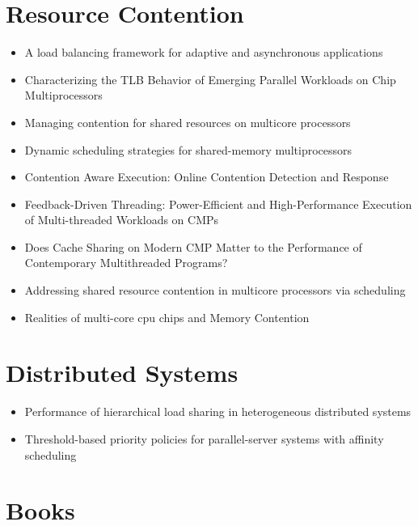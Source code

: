 \section*{Resource Contention}
\label{sec:lr-resource-contention}

\begin{itemize}
\item[\textbullet] A load balancing framework for adaptive and
  asynchronous applications \cite{Barker2004}
\item[\textbullet] Characterizing the TLB Behavior of Emerging
  Parallel Workloads on Chip Multiprocessors \cite{Bhattacharjee2009}
\item[\textbullet] Managing contention for shared resources on
  multicore processors \cite{Fedorova2010}
\item[\textbullet] Dynamic scheduling strategies for shared-memory
  multiprocessors \cite{Hamidzadeh1996}
\item[\textbullet] Contention Aware Execution: Online Contention
  Detection and Response \cite{Soffa2010}
\item[\textbullet] Feedback-Driven Threading: Power-Efficient and
  High-Performance Execution of Multi-threaded Workloads on CMPs
  \cite{Suleman2008}
\item[\textbullet] Does Cache Sharing on Modern CMP Matter to the
  Performance of Contemporary Multithreaded Programs? \cite{Zhang2010}
\item[\textbullet] Addressing shared resource contention in multicore
  processors via scheduling \cite{Zhuravlev2010}
\item[\textbullet] Realities of multi-core cpu chips and Memory
  Contention \cite{Barker2009}
\end{itemize}


\section*{Distributed Systems}
\label{sec:lr-distributed-systems}

\begin{itemize}
\item[\textbullet] Performance of hierarchical load sharing in
  heterogeneous distributed systems \cite{Lo1996}
\item[\textbullet] Threshold-based priority policies for
  parallel-server systems with affinity scheduling
  \cite{Squillante2001}
\end{itemize}


\section*{Books}
\label{sec:lr-books}


